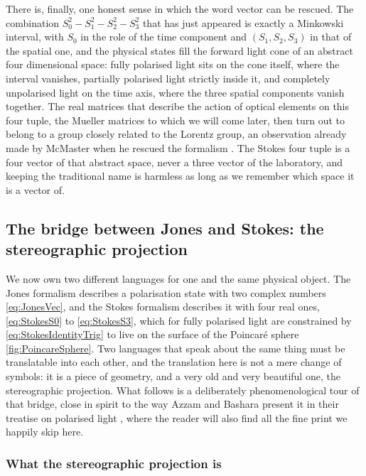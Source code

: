             There is, finally, one honest sense in which the word vector can be rescued. The combination $S_0^2-S_1^2-S_2^2-S_3^2$ that has just appeared is exactly a Minkowski interval, with $S_0$ in the role of the time component and $(S_1,S_2,S_3)$ in that of the spatial one, and the physical states fill the forward light cone of an abstract four dimensional space: fully polarised light sits on the cone itself, where the interval vanishes, partially polarised light strictly inside it, and completely unpolarised light on the time axis, where the three spatial components vanish together. The real matrices that describe the action of optical elements on this four tuple, the Mueller matrices to which we will come later, then turn out to belong to a group closely related to the Lorentz group, an observation already made by McMaster when he rescued the formalism \citep{mcmaster1954polarization}. The Stokes four tuple is a four vector of that abstract space, never a three vector of the laboratory, and keeping the traditional name is harmless as long as we remember which space it is a vector of.

    \subsection{The bridge between Jones and Stokes: the stereographic projection}

        We now own two different languages for one and the same physical object. The Jones formalism describes a polarisation state with two complex numbers \ref{eq:JonesVec}, and the Stokes formalism describes it with four real ones, \ref{eq:StokesS0} to \ref{eq:StokesS3}, which for fully polarised light are constrained by \ref{eq:StokesIdentityTrig} to live on the surface of the Poincaré sphere \ref{fig:PoincareSphere}. Two languages that speak about the same thing must be translatable into each other, and the translation here is not a mere change of symbols: it is a piece of geometry, and a very old and very beautiful one, the stereographic projection. What follows is a deliberately phenomenological tour of that bridge, close in spirit to the way Azzam and Bashara present it in their treatise on polarised light \citep{azzam1977ellipsometry}, where the reader will also find all the fine print we happily skip here.

        \subsubsection{What the stereographic projection is}

